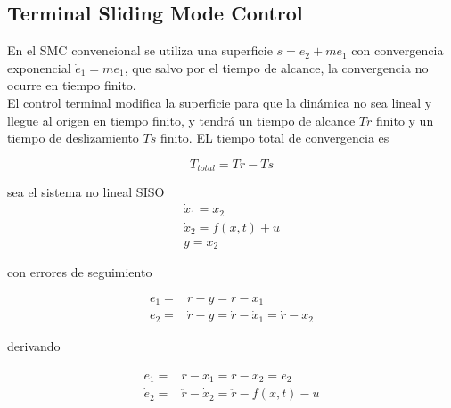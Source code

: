 \begin{flushright}
\end{flushright}

\subsection{Terminal Sliding Mode Control}

En el SMC convencional se utiliza una superficie $s=e_2+me_1$ con convergencia exponencial $\dot{e}_1=me_1$, que salvo por el tiempo de alcance, la convergencia no ocurre en tiempo finito.\\

El control terminal modifica la superficie para que la dinámica no sea lineal y llegue al origen en tiempo finito, y tendrá un tiempo de alcance $Tr$ finito y un tiempo de deslizamiento $Ts$ finito. EL tiempo total de convergencia es 

\begin{equation*}
    T_{total}=Tr-Ts
\end{equation*}

sea el sistema no lineal SISO\\

\begin{equation*}
    \begin{aligned}
        \dot{x}_1=x_2\\
        \dot{x}_2=f(x,t)+u\\
        y=x_2
    \end{aligned}
\end{equation*}

con errores de seguimiento

\begin{equation*}
    \begin{aligned}
        e_1=&r-y=r-x_1\\
        e_2=&\dot{r}-\dot{y}=\dot{r}-\dot{x}_1=\dot{r}-{x}_2
    \end{aligned}
\end{equation*}

derivando

\begin{equation*}
    \begin{aligned}
        \dot{e}_1=&\dot{r}-\dot{x}_1=\dot{r}-x_2=e_2\\
        \dot{e}_2=&\ddot{r}-\dot{x}_2=\ddot{r}-f(x,t)-u
    \end{aligned}
\end{equation*}

